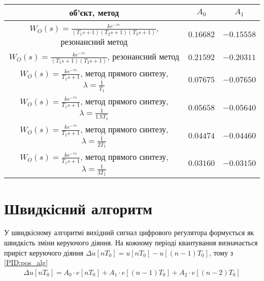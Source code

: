 \begin{center}
    \begin{tabular}{|c|c|c|}
        \hline
        об'єкт, метод & $A_0$ & $A_1$ \\
        \hline
        $W_O(s) = \frac{ k e^{-\tau s}}{(T_1 s + 1) (T_2 s + 1) (T_3 s + 1)}$, резонансний метод 
        & $0.16682$ & $-0.15558$ \\ \hline
        $W_O(s) = \frac{ k e^{-\tau s}}{(T_1 s + 1) (T_2 s + 1)}$, резонансний метод 
        & $0.21592$ & $-0.20311$ \\ \hline
        $W_O(s) = \frac{ k e^{-\tau s}}{T_1 s + 1}$, метод прямого синтезу, $\lambda = \frac{1}{T_1}$ 
        & $0.07675$ & $-0.07650$ \\ \hline
        $W_O(s) = \frac{ k e^{-\tau s}}{T_1 s + 1}$, метод прямого синтезу, $\lambda = \frac{1}{1.5T_1}$ 
        & $0.05658$ & $-0.05640$ \\ \hline
        $W_O(s) = \frac{ k e^{-\tau s}}{T_1 s + 1}$, метод прямого синтезу, $\lambda = \frac{1}{2T_1}$ 
        & $0.04474$ & $-0.04460$ \\ \hline
        $W_O(s) = \frac{ k e^{-\tau s}}{T_1 s + 1}$, метод прямого синтезу, $\lambda = \frac{1}{3T_1}$ 
        & $0.03160$ & $-0.03150$ \\ \hline
    \end{tabular}
\end{center}

\section{Швидкісний алгоритм}
У швидкісному алгоритмі вихідний сигнал цифрового регулятора формується як швидкість зміни керуючого діяння.
На кожному періоді квантування визначається приріст керуючого діяння
$\Delta u\left[n T_0\right] = u\left[n T_0\right] - u\left[(n-1) T_0\right]$,
тому з \eqref{PID:pos_alg}
\begin{gather}
    \Delta u\left[n T_0\right] = 
    A_0 \cdot e\left[n T_0\right] + A_1 \cdot e\left[(n-1) T_0\right] + A_2 \cdot e\left[(n-2) T_0\right]
\end{gather}
